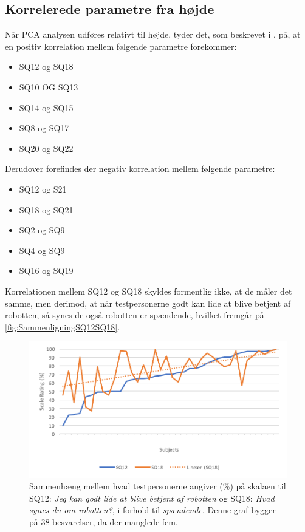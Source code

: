 \subsection{Korrelerede parametre fra højde}
\label{DatabehandlingSammenligningKorreleredeHoejde}
%
Når PCA analysen udføres relativt til højde, tyder det, som beskrevet i , på, at en positiv korrelation mellem følgende parametre forekommer:
%
\begin{itemize}
	\item SQ12 og SQ18
	\item SQ10 OG SQ13 
	\item SQ14 og SQ15
	\item SQ8 og SQ17
	\item SQ20 og SQ22\blankline
\end{itemize}
\noindent
%
Derudover forefindes der negativ korrelation mellem følgende parametre:
%
\begin{itemize}
	\item SQ12 og S21
	\item SQ18 og SQ21
	\item SQ2 og SQ9
	\item SQ4 og SQ9
	\item SQ16 og SQ19\blankline
\end{itemize}
\noindent
%
Korrelationen mellem SQ12 og SQ18 skyldes formentlig ikke, at de måler det samme, men derimod, at når testpersonerne godt kan lide at blive betjent af robotten, så synes de også robotten er spændende, hvilket fremgår på \autoref{fig:SammenligningSQ12SQ18}. 
%
\begin{figure}[H]
	\centering
	\includegraphics[width=\textwidth]{Figure/Korrelationsgrafer/SQ12+SQ18}
	\caption{Sammenhæng mellem hvad testpersonerne angiver (\%) på skalaen til SQ12: \textit{Jeg kan godt lide at blive betjent af robotten} og SQ18: \textit{Hvad synes du om robotten?}, i forhold til \textit{spændende}. Denne graf bygger på 38 besvarelser, da der manglede fem.}
	\label{fig:SammenligningSQ12SQ18}
\end{figure}
